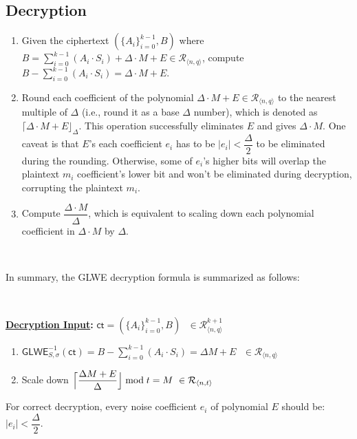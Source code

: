 \subsection{Decryption}
\label{subsec:glwe-dec}

\begin{enumerate}
\item Given the ciphertext $(\{A_i\}_{i=0}^{k-1}, B)$ where $B = \sum\limits_{i=0}^{k-1}{(A_i \cdot S_i)} + \Delta \cdot M + E \in \mathcal{R}_{\langle n,q \rangle}$, compute $B - \sum\limits_{i=0}^{k-1}{(A_i \cdot S_i)} = \Delta \cdot M + E$. 
\item Round each coefficient of the polynomial $\Delta \cdot M + E \in \mathcal{R}_{\langle n,q \rangle}$ to the nearest multiple of $\Delta$ (i.e., round it as a base $\Delta$ number), which is denoted as $\lceil \Delta \cdot M + E \rfloor_{\Delta}$. This operation successfully eliminates $E$ and gives $\Delta \cdot M$. One caveat is that $E$'s each coefficient $e_i$ has to be $|e_i| < \dfrac{\Delta}{2}$ to be eliminated during the rounding. Otherwise, some of $e_i$'s higher bits will overlap the plaintext $m_i$ coefficient's lower bit and won't be eliminated during decryption, corrupting the plaintext $m_i$.
\item Compute $\dfrac{\Delta \cdot M} {\Delta}$, which is equivalent to scaling down each polynomial coefficient in $\Delta \cdot M$ by $\Delta$. 
\end{enumerate}

$ $

In summary, the GLWE decryption formula is summarized as follows:

$ $

\begin{tcolorbox}[title={\textbf{\tboxlabel{\ref*{subsec:glwe-dec}} GLWE Decryption}}]
\textbf{\underline{Decryption Input}:} $\textsf{ct} = (\{A_i\}_{i=0}^{k-1}, B) \text{ } \in \mathcal{R}_{\langle n,q \rangle}^{k + 1}$

\begin{enumerate}
\item $\textsf{GLWE}^{-1}_{S,\sigma}(\textsf{ct}) = B - \sum\limits_{i=0}^{k-1}{(A_i \cdot S_i)} = \Delta  M + E \text{ } \in \mathcal{R}_{\langle n,q \rangle}$

\item Scale down 
$\Bigl\lceil \dfrac{ \Delta  M + E }{\Delta}\Bigr\rfloor \bmod t = M \text{ } \in \mathcal{R}_{\langle n, t \rangle}$

\end{enumerate}

For correct decryption, every noise coefficient $e_i$ of polynomial $E$ should be: $|e_i| < \dfrac{\Delta}{2}$.

\end{tcolorbox}


